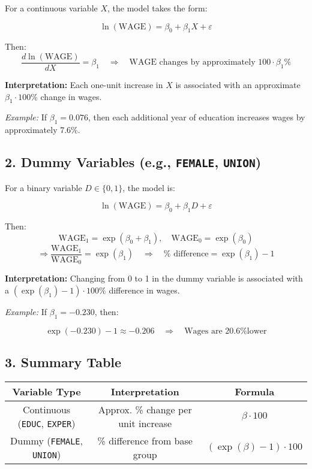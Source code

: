 \documentclass[12pt, oneside]{article}
\begin{document}
For a continuous variable \( X \), the model takes the form:

\[
\ln(\text{WAGE}) = \beta_0 + \beta_1 X + \varepsilon
\]

Then:
\[
\frac{d \ln(\text{WAGE})}{dX} = \beta_1 \quad \Rightarrow \quad \text{WAGE changes by approximately } 100 \cdot \beta_1\%
\]

\textbf{Interpretation:} Each one-unit increase in \( X \) is associated with an approximate \( \beta_1 \cdot 100\% \) change in wages.

\textit{Example:} If \( \beta_1 = 0.076 \), then each additional year of education increases wages by approximately 7.6\%.

\subsection*{2. Dummy Variables (e.g., \texttt{FEMALE}, \texttt{UNION})}

For a binary variable \( D \in \{0,1\} \), the model is:

\[
\ln(\text{WAGE}) = \beta_0 + \beta_1 D + \varepsilon
\]

Then:
\[
\text{WAGE}_1 = \exp(\beta_0 + \beta_1), \quad \text{WAGE}_0 = \exp(\beta_0)
\]
\[
\Rightarrow \frac{\text{WAGE}_1}{\text{WAGE}_0} = \exp(\beta_1)
\quad \Rightarrow \quad \% \text{ difference} = \exp(\beta_1) - 1
\]

\textbf{Interpretation:} Changing from 0 to 1 in the dummy variable is associated with a \( (\exp(\beta_1) - 1) \cdot 100\% \) difference in wages.

\textit{Example:} If \( \beta_1 = -0.230 \), then:

\[
\exp(-0.230) - 1 \approx -0.206 \quad \Rightarrow \quad \text{Wages are 20.6\% lower}
\]

\subsection*{3. Summary Table}

\begin{center}
\begin{tabular}{|c|c|c|}
\hline
\textbf{Variable Type} & \textbf{Interpretation} & \textbf{Formula} \\
\hline
Continuous (\texttt{EDUC}, \texttt{EXPER}) & Approx. \% change per unit increase & \( \beta \cdot 100 \) \\
\hline
Dummy (\texttt{FEMALE}, \texttt{UNION}) & \% difference from base group & \( (\exp(\beta) - 1) \cdot 100 \) \\
\hline
\end{tabular}
\end{center}
\end{document}
